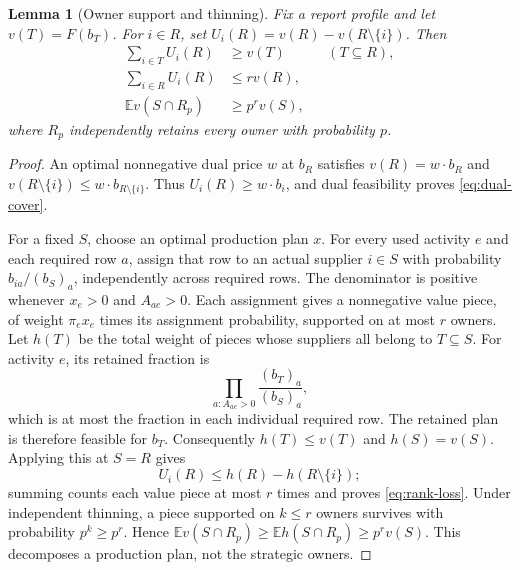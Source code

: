 \documentclass[11pt]{article}
\newtheorem{lemma}[theorem]{Lemma}
\theoremstyle{definition}\newtheorem{definition}[theorem]{Definition}
\theoremstyle{remark}\newtheorem{remark}[theorem]{Remark}
\begin{document}
\begin{lemma}[Owner support and thinning]\label{lem:owner-support}
Fix a report profile and let $v(T)=F(b_T)$. For $i\in R$, set
$U_i(R)=v(R)-v(R\setminus\{i\})$. Then
\begin{align}
 \sum_{i\in T}U_i(R)&\ge v(T) &&(T\subseteq R),\label{eq:dual-cover}\\
 \sum_{i\in R}U_i(R)&\le r v(R),\label{eq:rank-loss}\\
 \mathbb E v(S\cap R_p)&\ge p^r v(S),\label{eq:thinning}
\end{align}
where $R_p$ independently retains every owner with probability $p$.
\end{lemma}
\begin{proof}
An optimal nonnegative dual price $w$ at $b_R$ satisfies
$v(R)=w\cdot b_R$ and $v(R\setminus\{i\})\le w\cdot b_{R\setminus\{i\}}$.
Thus $U_i(R)\ge w\cdot b_i$, and dual feasibility proves
\eqref{eq:dual-cover}.

For a fixed $S$, choose an optimal production plan $x$. For every used
activity $e$ and each required row $a$, assign that row to an actual supplier
$i\in S$ with probability $b_{ia}/(b_S)_a$, independently across required
rows. The denominator is positive whenever $x_e>0$ and $A_{ae}>0$.
Each assignment gives a nonnegative value piece, of weight
$\pi_e x_e$ times its assignment probability, supported on at most $r$ owners.
Let $h(T)$ be the total weight of pieces whose suppliers all belong to
$T\subseteq S$. For activity $e$, its retained fraction is
\[
 \prod_{a:A_{ae}>0}\frac{(b_T)_a}{(b_S)_a},
\]
which is at most the fraction in each individual required row. The retained
plan is therefore feasible for $b_T$. Consequently $h(T)\le v(T)$ and
$h(S)=v(S)$. Applying this at $S=R$ gives
\[
 U_i(R)\le h(R)-h(R\setminus\{i\});
\]
summing counts each value piece at most $r$ times and proves
\eqref{eq:rank-loss}. Under independent thinning, a piece supported on $k\le r$
owners survives with probability $p^k\ge p^r$. Hence
$\mathbb E v(S\cap R_p)\ge\mathbb E h(S\cap R_p)\ge p^r v(S)$.
This decomposes a production plan, not the strategic owners.
\end{proof}
\end{document}
